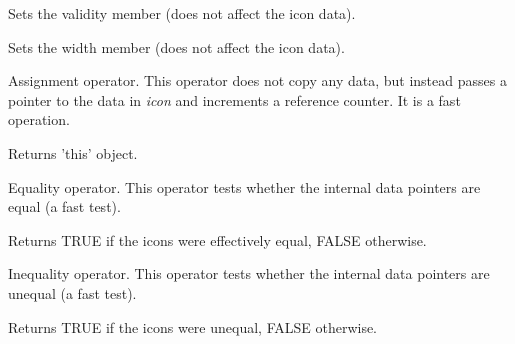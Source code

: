 


Sets the validity member (does not affect the icon data).





Sets the width member (does not affect the icon data).





Assignment operator. This operator does not copy any data, but instead
passes a pointer to the data in {\it icon} and increments a reference
counter. It is a fast operation.




Returns 'this' object.



Equality operator. This operator tests whether the internal data pointers are
equal (a fast test).




Returns TRUE if the icons were effectively equal, FALSE otherwise.



Inequality operator. This operator tests whether the internal data pointers are
unequal (a fast test).




Returns TRUE if the icons were unequal, FALSE otherwise.


